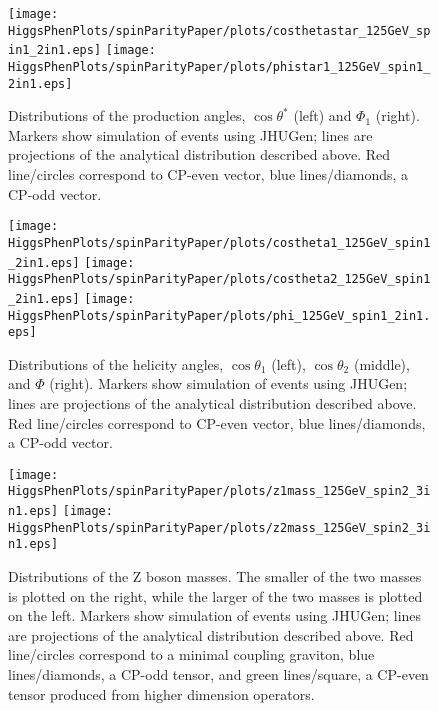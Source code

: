 \begin{figure}
\begin{center}
\texttt{[image: HiggsPhenPlots/spinParityPaper/plots/costhetastar\_125GeV\_spin1\_2in1.eps]}
\texttt{[image: HiggsPhenPlots/spinParityPaper/plots/phistar1\_125GeV\_spin1\_2in1.eps]}
\caption{Distributions of the production angles, $\cos\theta^*$ (left) and 
$\Phi_1$ (right).  Markers show simulation of events using JHUGen; lines 
are projections
of the analytical distribution described above.   Red line/circles correspond
to CP-even vector, blue lines/diamonds, a CP-odd vector.}
\label{fig:VectorProdAngles}
\end{center}
\end{figure}

\begin{figure}
\begin{center}
\texttt{[image: HiggsPhenPlots/spinParityPaper/plots/costheta1\_125GeV\_spin1\_2in1.eps]}
\texttt{[image: HiggsPhenPlots/spinParityPaper/plots/costheta2\_125GeV\_spin1\_2in1.eps]}
\texttt{[image: HiggsPhenPlots/spinParityPaper/plots/phi\_125GeV\_spin1\_2in1.eps]}
\caption{Distributions of the helicity angles, $\cos\theta_1$ (left), 
$\cos\theta_2$ (middle), and $\Phi$ (right). Markers show simulation of 
events using JHUGen; lines are projections
of the analytical distribution described above.  Red line/circles correspond
to CP-even vector, blue lines/diamonds, a CP-odd vector.}
\label{fig:VectorHelicityAngles}
\end{center}
\end{figure}

\begin{figure}
\begin{center}
\texttt{[image: HiggsPhenPlots/spinParityPaper/plots/z1mass\_125GeV\_spin2\_3in1.eps]}
\texttt{[image: HiggsPhenPlots/spinParityPaper/plots/z2mass\_125GeV\_spin2\_3in1.eps]}
\caption{Distributions of the Z boson masses.  The smaller of the two masses is
plotted on the right, while the larger of the two masses is plotted on the
left. Markers show simulation of events using JHUGen; lines are projections
of the analytical distribution described above.  Red line/circles correspond
to a minimal coupling graviton, blue lines/diamonds, a CP-odd tensor, 
and green lines/square, 
a CP-even tensor produced from higher dimension operators.}
\label{fig:TensorMasses}
\end{center}
\end{figure}

